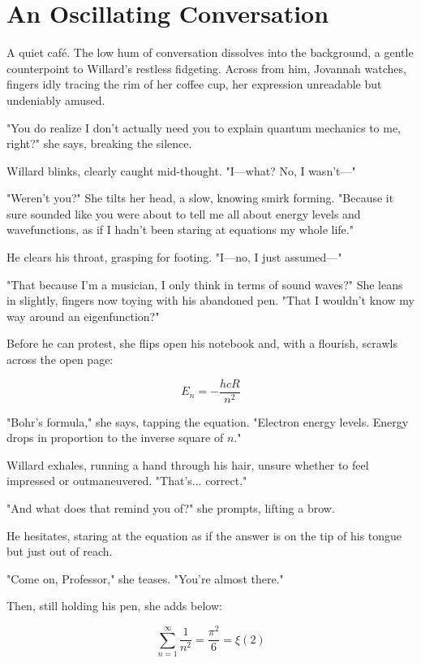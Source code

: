 \section*{An Oscillating Conversation}

A quiet café. The low hum of conversation dissolves into the background, a gentle counterpoint to Willard’s restless fidgeting. Across from him, Jovannah watches, fingers idly tracing the rim of her coffee cup, her expression unreadable but undeniably amused.

"You do realize I don’t actually need you to explain quantum mechanics to me, right?" she says, breaking the silence.

Willard blinks, clearly caught mid-thought. "I—what? No, I wasn’t—"

"Weren’t you?" She tilts her head, a slow, knowing smirk forming. "Because it sure sounded like you were about to tell me all about energy levels and wavefunctions, as if I hadn’t been staring at equations my whole life."

He clears his throat, grasping for footing. "I—no, I just assumed—"

"That because I’m a musician, I only think in terms of sound waves?" She leans in slightly, fingers now toying with his abandoned pen. "That I wouldn’t know my way around an eigenfunction?"

Before he can protest, she flips open his notebook and, with a flourish, scrawls across the open page:

\begin{equation}
E_n = - \frac{h c R}{n^2}
\end{equation}

"Bohr’s formula," she says, tapping the equation. "Electron energy levels. Energy drops in proportion to the inverse square of \(n\)."

Willard exhales, running a hand through his hair, unsure whether to feel impressed or outmaneuvered. "That’s... correct."

"And what does that remind you of?" she prompts, lifting a brow.

He hesitates, staring at the equation as if the answer is on the tip of his tongue but just out of reach.

"Come on, Professor," she teases. "You’re almost there."

Then, still holding his pen, she adds below:

\begin{equation}
\sum_{n=1}^{\infty} \frac{1}{n^2} = \frac{\pi^2}{6} = \xi(2)
\end{equation}


